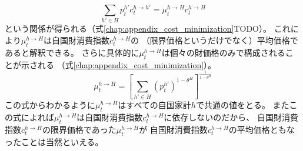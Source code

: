 \begin{equation}
\label{form:chapter3_households_stage1a_home_c_h_H_problem_mu_h_H_average_eq}
    \sum_{h'\in H}p_t^{h'}c_t^{h\to h'}=\mu_t^{h\to H}c_t^{h\to H}
\end{equation}
という関係が得られる（式\eqref{chap:appendix_cost_minimization}TODO）。
これにより\(\mu_t^{h\to H}\)は自国財消費指数\(c_t^{h\to H}\)の
（限界価格というだけでなく）平均価格であると解釈できる。
さらに具体的に\(\mu_t^{h\to H}\)は個々の財価格のみで構成されることが示される
（式\eqref{chap:appendix_cost_minimization}）。
\begin{equation}
\label{form:chapter3_households_stage1a_home_c_h_H_problem_mu_h_H_eq}
    \mu_t^{h\to H}=\left[\sum_{h'\in H}(p_t^{h'})^{1-\theta^H}\right]^{\frac{1}{1-\theta^H}}
\end{equation}
この式からわかるように\(\mu_t^{h\to H}\)はすべての自国家計\(h\)で共通の値をとる。
またこの式によれば\(\mu_t^{h\to H}\)は自国財消費指数\(c_t^{h\to H}\)に依存しないのだから、
自国財消費指数\(c_t^{h\to H}\)の限界価格であった\(\mu_t^{h\to H}\)が
自国財消費指数\(c_t^{h\to H}\)の平均価格ともなったことは当然といえる。

